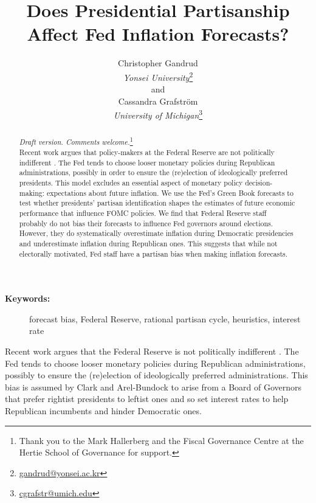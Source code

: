 \documentclass[a4paper]{article}\usepackage{graphicx, color}
\title{Does Presidential Partisanship Affect Fed Inflation Forecasts?}
\author{Christopher Gandrud \\
                {\emph{Yonsei University}}\footnote{\href{mailto:gandrud@yonsei.ac.kr}{gandrud@yonsei.ac.kr}} \\
                and \\
            Cassandra Grafstr\"{o}m \\
                {\emph{University of Michigan}}\footnote{\href{mailto:cgrafstr@umich.edu}{cgrafstr@umich.edu}}}
\begin{document}
\maketitle

\begin{abstract}
\noindent\emph{Draft version. Comments welcome.}\footnote{Thank you to the Mark Hallerberg and the Fiscal Governance Centre at the Hertie School of Governance for support.} \\[0.2cm]

Recent work argues that policy-makers at the Federal Reserve are not politically indifferent \citep{Clark2011}. The Fed tends to choose looser monetary policies during Republican administrations, possibly in order to ensure the (re)election of ideologically preferred presidents. This model excludes an essential aspect of monetary policy decision-making: expectations about future inflation. We use the Fed's Green Book forecasts to test whether presidents' partisan identification shapes the estimates of future economic performance that influence FOMC policies. We find that Federal Reserve staff probably do not bias their forecasts to influence Fed governors around elections. However, they do systematically overestimate inflation during Democratic presidencies and underestimate inflation during Republican ones. This suggests that while not electorally motivated, Fed staff have a partisan bias when making inflation forecasts.

\end{abstract}

\begin{description}
  \item [{\textbf{Keywords:}}] forecast bias, Federal Reserve, rational partisan cycle, heuristics, interest rate
\end{description}

\vspace{0.3cm}

Recent work argues that the Federal Reserve is not politically indifferent \citep{Clark2011}. The Fed tends to choose looser monetary policies during Republican administrations, possibly to ensure the (re)election of ideologically preferred administrations. This bias is assumed by Clark and Arel-Bundock to arise from a Board of Governors that prefer rightist presidents to leftist ones and so set interest rates to help Republican incumbents and hinder Democratic ones. 

\end{document}
